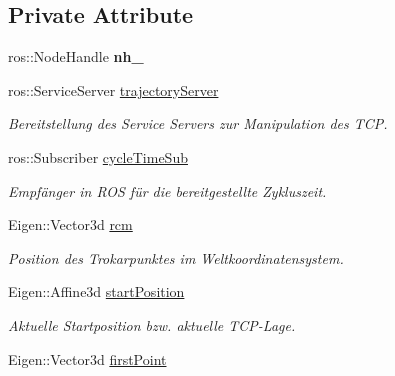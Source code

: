 \subsection*{Private Attribute}
\begin{DoxyCompactItemize}
\item 
\hypertarget{classTrajectoryGenerator_a1e215049f93f2b354d7d246ac8d070f2}{ros\-::\-Node\-Handle {\bfseries nh\-\_\-}}\label{classTrajectoryGenerator_a1e215049f93f2b354d7d246ac8d070f2}

\item 
\hypertarget{classTrajectoryGenerator_a33fc40f24dfab51390b800280dd8ce46}{ros\-::\-Service\-Server \hyperlink{classTrajectoryGenerator_a33fc40f24dfab51390b800280dd8ce46}{trajectory\-Server}}\label{classTrajectoryGenerator_a33fc40f24dfab51390b800280dd8ce46}

\begin{DoxyCompactList}\small\item\em Bereitstellung des Service Servers zur Manipulation des T\-C\-P. \end{DoxyCompactList}\item 
\hypertarget{classTrajectoryGenerator_a7250335d598f1d556b5e826dd206fbc8}{ros\-::\-Subscriber \hyperlink{classTrajectoryGenerator_a7250335d598f1d556b5e826dd206fbc8}{cycle\-Time\-Sub}}\label{classTrajectoryGenerator_a7250335d598f1d556b5e826dd206fbc8}

\begin{DoxyCompactList}\small\item\em Empfänger in R\-O\-S für die bereitgestellte Zykluszeit. \end{DoxyCompactList}\item 
\hypertarget{classTrajectoryGenerator_a676b24e0945d8a8623b3d9ca310b621b}{Eigen\-::\-Vector3d \hyperlink{classTrajectoryGenerator_a676b24e0945d8a8623b3d9ca310b621b}{rcm}}\label{classTrajectoryGenerator_a676b24e0945d8a8623b3d9ca310b621b}

\begin{DoxyCompactList}\small\item\em Position des Trokarpunktes im Weltkoordinatensystem. \end{DoxyCompactList}\item 
\hypertarget{classTrajectoryGenerator_a08c164f7f59ef59a7da96c96f0f60f73}{Eigen\-::\-Affine3d \hyperlink{classTrajectoryGenerator_a08c164f7f59ef59a7da96c96f0f60f73}{start\-Position}}\label{classTrajectoryGenerator_a08c164f7f59ef59a7da96c96f0f60f73}

\begin{DoxyCompactList}\small\item\em Aktuelle Startposition bzw. aktuelle T\-C\-P-\/\-Lage. \end{DoxyCompactList}\item 
\hypertarget{classTrajectoryGenerator_a608c44ff96e9d2504f35b8ff0233ec3b}{Eigen\-::\-Vector3d \hyperlink{classTrajectoryGenerator_a608c44ff96e9d2504f35b8ff0233ec3b}{first\-Point}}\label{classTrajectoryGenerator_a608c44ff96e9d2504f35b8ff0233ec3b}


\end{DoxyCompactItemize}
